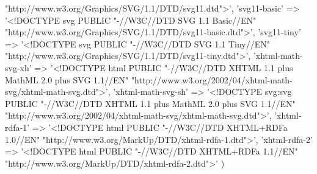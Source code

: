 \begin{DoxyCode}
{       "http://www.w3.org/Graphics/SVG/1.1/DTD/svg11.dtd">'},
    \textcolor{stringliteral}{'svg11-basic'} => \textcolor{stringliteral}{'<!DOCTYPE svg PUBLIC "-//W3C//DTD SVG 1.1 Basic//EN"
       "http://www.w3.org/Graphics/SVG/1.1/DTD/svg11-basic.dtd">'},
    \textcolor{stringliteral}{'svg11-tiny'} => \textcolor{stringliteral}{'<!DOCTYPE svg PUBLIC "-//W3C//DTD SVG 1.1 Tiny//EN"
       "http://www.w3.org/Graphics/SVG/1.1/DTD/svg11-tiny.dtd">'},
    \textcolor{stringliteral}{'xhtml-math-svg-xh'} => \textcolor{stringliteral}{'<!DOCTYPE html PUBLIC "-//W3C//DTD XHTML 1.1 plus MathML 2.0 plus SVG 1.1//EN"
       "http://www.w3.org/2002/04/xhtml-math-svg/xhtml-math-svg.dtd">'},
    \textcolor{stringliteral}{'xhtml-math-svg-sh'} => \textcolor{stringliteral}{'<!DOCTYPE svg:svg PUBLIC "-//W3C//DTD XHTML 1.1 plus MathML 2.0 plus SVG
       1.1//EN" "http://www.w3.org/2002/04/xhtml-math-svg/xhtml-math-svg.dtd">'},
    \textcolor{stringliteral}{'xhtml-rdfa-1'} => \textcolor{stringliteral}{'<!DOCTYPE html PUBLIC "-//W3C//DTD XHTML+RDFa 1.0//EN"
       "http://www.w3.org/MarkUp/DTD/xhtml-rdfa-1.dtd">'},
    \textcolor{stringliteral}{'xhtml-rdfa-2'} => \textcolor{stringliteral}{'<!DOCTYPE html PUBLIC "-//W3C//DTD XHTML+RDFa 1.1//EN"
       "http://www.w3.org/MarkUp/DTD/xhtml-rdfa-2.dtd">'}
)
\end{DoxyCode}
